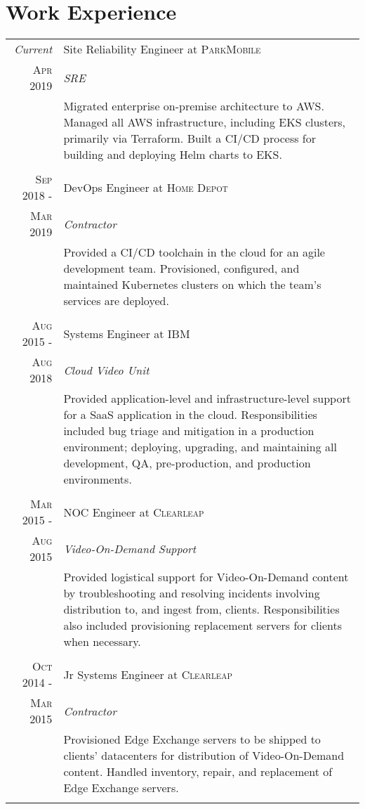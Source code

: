 \documentclass[a4paper,9pt]{extarticle}
\begin{document}
\section{Work Experience}
\begin{tabular}{r|p{8.5cm}}
 \emph{Current}&Site Reliability Engineer at \textsc{ParkMobile}\\\textsc{Apr 2019}&\emph{SRE}\\&\footnotesize{Migrated enterprise on-premise architecture to AWS. Managed all AWS infrastructure, including EKS clusters, primarily via Terraform. Built a CI/CD process for building and deploying Helm charts to EKS.}\\\multicolumn{2}{c}{}\\
 \textsc{Sep 2018 -}&DevOps Engineer at \textsc{Home Depot}\\\textsc{Mar 2019}&\emph{Contractor}\\&\footnotesize{Provided a CI/CD toolchain in the cloud for an agile development team. Provisioned, configured, and maintained Kubernetes clusters on which the team's services are deployed.}\\\multicolumn{2}{c}{}\\
 \textsc{Aug 2015 -}&Systems Engineer at \textsc{IBM}\\\textsc{Aug 2018}&\emph{Cloud Video Unit}\\&\footnotesize{Provided application-level and infrastructure-level support for a SaaS application in the cloud. Responsibilities included bug triage and mitigation in a production environment; deploying, upgrading, and maintaining all development, QA, pre-production, and production environments.}\\\multicolumn{2}{c}{}\\
 \textsc{Mar 2015 -}&NOC Engineer at \textsc{Clearleap}\\\textsc{Aug 2015}&\emph{Video-On-Demand Support}\\&\footnotesize{Provided logistical support for Video-On-Demand content by troubleshooting and resolving incidents involving distribution to, and ingest from, clients. Responsibilities also included provisioning replacement servers for clients when necessary.}\\\multicolumn{2}{c}{}\\
 \textsc{Oct 2014 -}&Jr Systems Engineer at \textsc{Clearleap}\\\textsc{Mar 2015}&\emph{Contractor}\\&\footnotesize{Provisioned Edge Exchange servers to be shipped to clients' datacenters for distribution of Video-On-Demand content. Handled inventory, repair, and replacement of Edge Exchange servers.}\\\multicolumn{2}{c}{}\\
\end{tabular}
\end{document}
